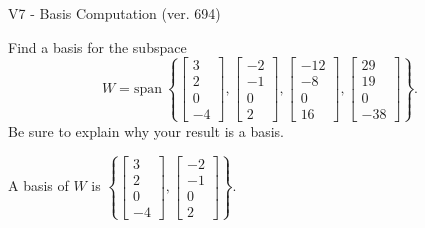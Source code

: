 \begin{exercise}
  \begin{exerciseTitle}V7 - Basis Computation (ver. 694)\end{exerciseTitle}
  \begin{exerciseStatement}
    Find a basis for the subspace 
\[W=\mathrm{span}\ \left\{\left[\begin{array}{r}
3 \\
2 \\
0 \\
-4
\end{array}\right] , \left[\begin{array}{r}
-2 \\
-1 \\
0 \\
2
\end{array}\right] , \left[\begin{array}{r}
-12 \\
-8 \\
0 \\
16
\end{array}\right] , \left[\begin{array}{r}
29 \\
19 \\
0 \\
-38
\end{array}\right]\right\}.\]
 Be sure to explain why your result is a basis.


  \end{exerciseStatement}
  \begin{exerciseAnswer}
   A basis of \(W\) is  \(\left\{\left[\begin{array}{r}
3 \\
2 \\
0 \\
-4
\end{array}\right] , \left[\begin{array}{r}
-2 \\
-1 \\
0 \\
2
\end{array}\right]\right\}\).
  


  \end{exerciseAnswer}
\end{exercise}